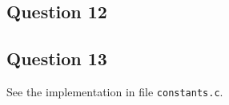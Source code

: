 
\subsection*{Question 12}


\subsection*{Question 13}
 
See the implementation in file \texttt{constants.c}.



